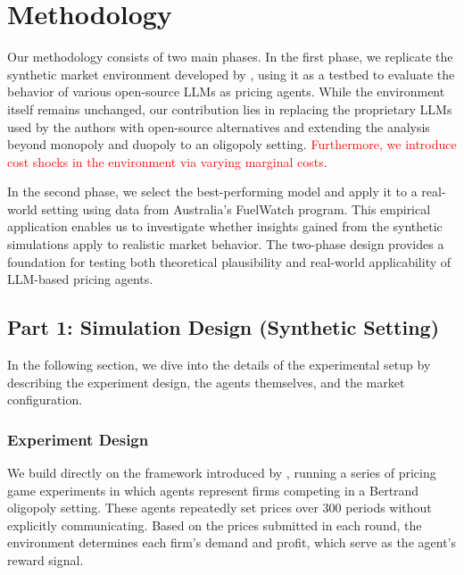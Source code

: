 \section{Methodology}\label{sec:meth}

Our methodology consists of two main phases. In the first phase, we replicate the synthetic market environment developed by \textcite{fish_algorithmic_2025}, using it as a testbed to evaluate the behavior of various open-source LLMs as pricing agents. While the environment itself remains unchanged, our contribution lies in replacing the proprietary LLMs used by the authors with open-source alternatives and extending the analysis beyond monopoly and duopoly to an oligopoly setting. \textcolor{red}{Furthermore, we introduce cost shocks in the environment via varying marginal costs}.

In the second phase, we select the best-performing model and apply it to a real-world setting using data from Australia's FuelWatch program. This empirical application enables us to investigate whether insights gained from the synthetic simulations apply to realistic market behavior. The two-phase design provides a foundation for testing both theoretical plausibility and real-world applicability of LLM-based pricing agents.

\subsection{Part 1: Simulation Design (Synthetic Setting)}

In the following section, we dive into the details of the experimental setup by describing the experiment design, the agents themselves, and the market configuration.

\subsubsection*{Experiment Design}

We build directly on the framework introduced by \textcite{fish_algorithmic_2025}, running a series of pricing game experiments in which agents represent firms competing in a Bertrand oligopoly setting. These agents repeatedly set prices over 300 periods without explicitly communicating. Based on the prices submitted in each round, the environment determines each firm's demand and profit, which serve as the agent’s reward signal.



